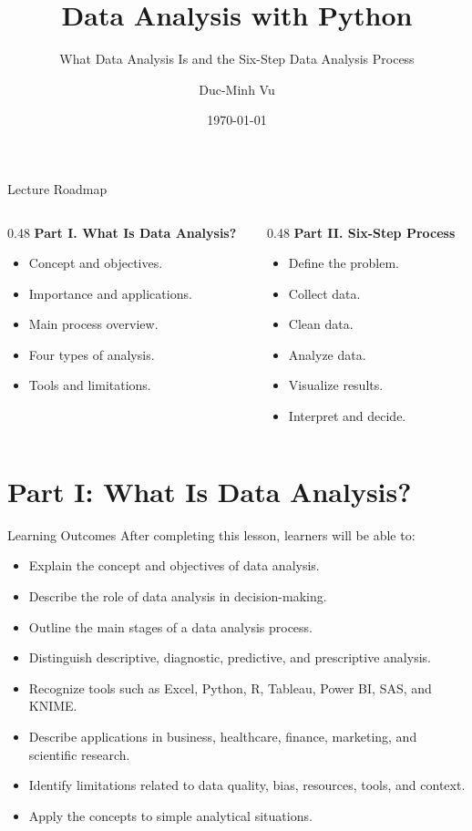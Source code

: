 \documentclass[aspectratio=169,11pt]{beamer}
\title[Data Analysis Foundations]{Data Analysis with Python}
\subtitle{What Data Analysis Is and the Six-Step Data Analysis Process}
\author{Duc-Minh Vu}
\institute{SLSCM Lab - FDA - NEU}
\date{\today}
\begin{document}
\begin{frame}
  \titlepage
\end{frame}


\begin{frame}{Lecture Roadmap}
\begin{columns}[T]
\begin{column}{0.48\linewidth}
\textbf{Part I. What Is Data Analysis?}
\begin{itemize}
  \item Concept and objectives.
  \item Importance and applications.
  \item Main process overview.
  \item Four types of analysis.
  \item Tools and limitations.
\end{itemize}
\end{column}
\begin{column}{0.48\linewidth}
\textbf{Part II. Six-Step Process}
\begin{itemize}
  \item Define the problem.
  \item Collect data.
  \item Clean data.
  \item Analyze data.
  \item Visualize results.
  \item Interpret and decide.
\end{itemize}
\end{column}
\end{columns}
\end{frame}

\section{Part I: What Is Data Analysis?}


\begin{frame}{Learning Outcomes}
After completing this lesson, learners will be able to:
\begin{itemize}
  \item Explain the concept and objectives of data analysis.
  \item Describe the role of data analysis in decision-making.
  \item Outline the main stages of a data analysis process.
  \item Distinguish descriptive, diagnostic, predictive, and prescriptive analysis.
  \item Recognize tools such as Excel, Python, R, Tableau, Power BI, SAS, and KNIME.
  \item Describe applications in business, healthcare, finance, marketing, and scientific research.
  \item Identify limitations related to data quality, bias, resources, tools, and context.
  \item Apply the concepts to simple analytical situations.
\end{itemize}
\end{frame}
\end{document}
